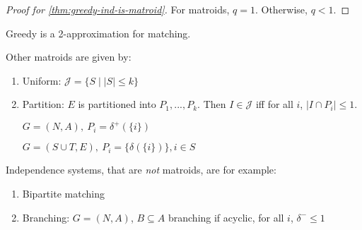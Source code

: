 \begin{proof}[Proof for \autoref{thm:greedy-ind-is-matroid}]
    For matroids, $q=1$. Otherwise, $q < 1$.
\end{proof}
\begin{corollary}
    Greedy is a 2-approximation for matching.
\end{corollary}
\begin{example}
    Other matroids are given by:
    \begin{enumerate}
        \item Uniform: $\mathcal{J}=\{S \mid |S| \leq k\}$
        \item Partition: $E$ is partitioned into $P_1,...,P_k$. Then $I \in \mathcal{J}$ iff for all $i$, $|I \cap P_i| \leq 1$.
        
        $G=(N,A),\ P_i = \delta^+(\{i\})$

        $G=(S \cup T,E),\ P_i=\{\delta(\{i\})\}, i \in S$
    \end{enumerate}
\end{example}
\begin{example}
    Independence systems, that are \emph{not} matroids, are for example:
    \begin{enumerate}
        \item Bipartite matching
        \item Branching: $G=(N,A)$, $B \subseteq A$ branching if acyclic, for all $i$, $\delta^- \leq 1$
    \end{enumerate}
\end{example}